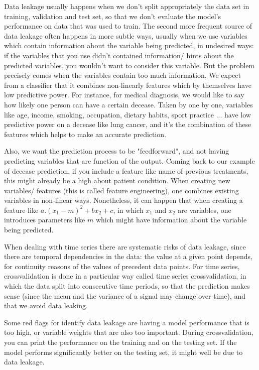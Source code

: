 \documentclass[24pt]{article}
\begin{document}
Data leakage usually happens when we don't split appropriately the data set in training, validation and test set, so that we don't evaluate the model's performance on data that was used to train.
The second more frequent source of data leakage often happens in more subtle ways, usually when we use variables which contain information about the variable being predicted, in undesired ways: if the variables that you use didn't contained information/ hints about the predicted variables, you wouldn't want to consider this variable. But the problem precisely comes when the variables contain too much information. We 
 expect from a classifier that it combines non-linearly features which by themselves have low predictive power. For instance, for medical diagnosis, we would like to say how likely one person can have a certain decease. Taken by one by one, variables like age, income, smoking, occupation,  dietary habits, sport practice ... have low predictive power on a decease like lung cancer, and it's the combination of these features which helps to make an accurate prediction.
 

Also, we want the prediction process to be "feedforward", and not having predicting variables that are function of the output. Coming back to our example of decease prediction, if you include a feature like name of previous treatments, this might already be a high about patient condition. When creating new variables/ features (this is called feature engineering), one combines existing variables in non-linear ways. Nonetheless, it can happen that when creating a feature like $a.(x_1-m)^2 + bx_2 + c$, in which $x_1$ and $x_2$ are variables, one introduces parameters like $m$ which might have information about the variable being predicted. 

When dealing with time series there are systematic risks of data leakage, since there are temporal dependencies in the data: the value at a given point depends, for continuity reasons of the values of precedent data points. For time series, crossvalidation is done in a particular way called time series crossvalidation, in which the data split into consecutive time periods, so that the prediction makes sense (since the mean and the variance of a signal may change over time), and that we avoid data leaking.


Some red flags for identify data leakage are having a model performance that is too high, or variable weights that are also too important. During crossvalidation, you can print the performance on the training and on the testing set. If the model performs significantly better on the testing set, it might well be due to data leakage. 
 
\end{document}
